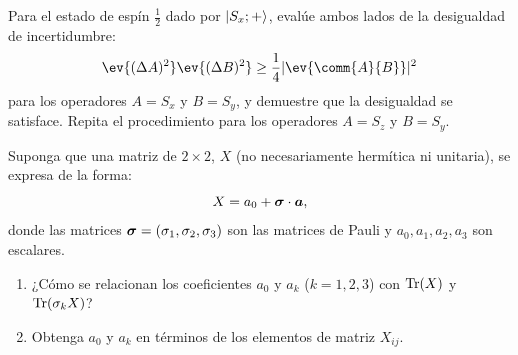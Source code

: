 \begin{enunciado}
Para el estado de espín $\frac{1}{2}$ dado por $\lvert S_x; +\rangle$, evalúe ambos lados de la desigualdad de incertidumbre:
\[
\ev{(\Delta A)^2} \ev{(\Delta B)^2} \ge \frac{1}{4} \abs{\ev{\comm{A}{B}}}^2
\]
para los operadores $A = S_x$ y $B = S_y$, y demuestre que la desigualdad se satisface. Repita el procedimiento para los operadores $A = S_z$ y $B = S_y$.
\end{enunciado}
\begin{enunciado}
Suponga que una matriz de $2 \times 2$, $X$ (no necesariamente hermítica ni unitaria), se expresa de la forma:
\[
X = a_0 + \bm{\sigma} \cdot \bm{a},
\]
donde las matrices $\bm{\sigma} = (\sigma_1, \sigma_2, \sigma_3)$ son las matrices de Pauli y $a_0, a_1, a_2, a_3$ son escalares.
\begin{enumerate}
  \item ¿Cómo se relacionan los coeficientes $a_0$ y $a_k$ ($k=1,2,3$) con $\operatorname{Tr}(X)$ y $\operatorname{Tr}(\sigma_k X)$?
  \item Obtenga $a_0$ y $a_k$ en términos de los elementos de matriz $X_{ij}$.
\end{enumerate}
\end{enunciado}

